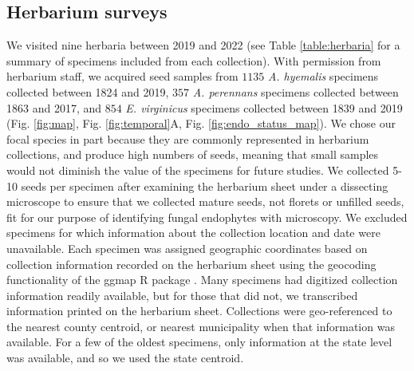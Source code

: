 \documentclass[11pt]{article}
\begin{document}
		\subsection*{Herbarium surveys}
We visited nine herbaria between 2019 and 2022 (see Table \ref{table:herbaria} for a summary of specimens included from each collection). 
With permission from herbarium staff, we acquired seed samples from $1135$ \emph{A. hyemalis} specimens collected between 1824 and 2019, $357$ \emph{A. perennans} specimens collected between 1863 and 2017, and $854$ \emph{E. virginicus} specimens collected between 1839 and 2019 (Fig. \ref{fig:map}, Fig. \ref{fig:temporal}A, Fig. \ref{fig:endo_status_map}).
We chose our focal species in part because they are commonly represented in herbarium collections, and produce high numbers of seeds, meaning that small samples would not diminish the value of the specimens for future studies. 
We collected 5-10 seeds per specimen after examining the herbarium sheet under a dissecting microscope to ensure that we collected mature seeds, not florets or unfilled seeds, fit for our purpose of identifying fungal endophytes with microscopy.
We excluded specimens for which information about the collection location and date were unavailable.
Each specimen was assigned geographic coordinates based on collection information recorded on the herbarium sheet using the geocoding functionality of the ggmap R package \citep{kahle2019package}.
Many specimens had digitized collection information readily available, but for those that did not, we transcribed information printed on the herbarium sheet. 
Collections were geo-referenced to the nearest county centroid, or nearest municipality when that information was available. 
For a few of the oldest specimens, only information at the state level was available, and so we used the state centroid.
\end{document}
